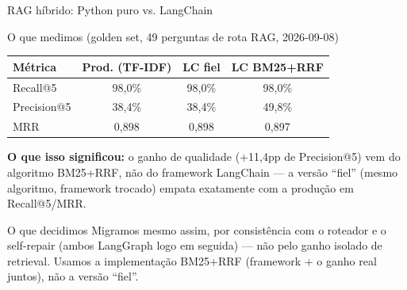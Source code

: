 \documentclass{beamer}
\newenvironment{numerobloco}[1]{\begin{block}{#1}}{\end{block}}
\newenvironment{decisaobloco}[1]{\begin{alertblock}{#1}}{\end{alertblock}}
\begin{document}
\begin{frame}{RAG híbrido: Python puro vs. LangChain}
  \small
  \begin{numerobloco}{O que medimos (golden set, 49 perguntas de rota RAG, 2026-09-08)}
    \begin{center}
    \begin{tabular}{lccc}
      \toprule
      \textbf{Métrica} & \textbf{Prod. (TF-IDF)} & \textbf{LC fiel} & \textbf{LC BM25+RRF} \\
      \midrule
      Recall@5    & 98,0\%  & 98,0\%  & 98,0\%  \\
      Precision@5 & 38,4\%  & 38,4\%  & \alert{49,8\%} \\
      MRR         & 0,898   & 0,898   & 0,897   \\
      \bottomrule
    \end{tabular}
    \end{center}
  \end{numerobloco}

  \pause
  \textbf{O que isso significou:} o ganho de qualidade (+11,4pp de Precision@5) vem do
  \alert{algoritmo} BM25+RRF, não do framework LangChain — a versão ``fiel'' (mesmo algoritmo,
  framework trocado) empata exatamente com a produção em Recall@5/MRR.

  \pause
  \begin{decisaobloco}{O que decidimos}
    Migramos mesmo assim, por consistência com o roteador e o self-repair (ambos LangGraph
    logo em seguida) — não pelo ganho isolado de retrieval. Usamos a implementação BM25+RRF
    (framework + o ganho real juntos), não a versão ``fiel''.
  \end{decisaobloco}
\end{frame}
\end{document}
